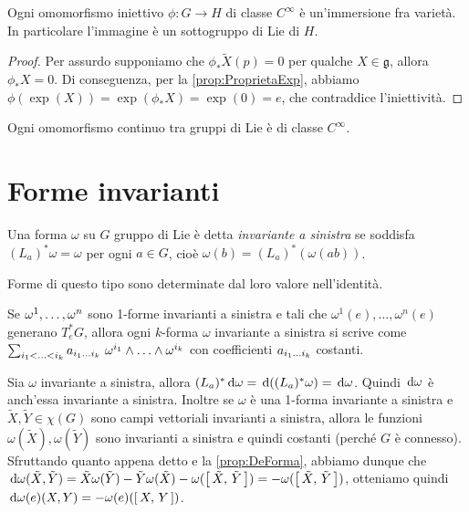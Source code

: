 \begin{corollary}
	Ogni omomorfismo iniettivo $\phi : G \to H$ di classe $C^\infty$ è un'immersione fra varietà. In particolare l'immagine è un sottogruppo di Lie di $H$.
\end{corollary}
\begin{proof}
	Per assurdo supponiamo che $\phi_*\tilde X(p) = 0$ per qualche $X \in \mathfrak g$, allora $\phi_*X = 0$. Di conseguenza, per la \cref{prop:ProprietaExp}, abbiamo $\phi(\exp(X)) = \exp(\phi_*X) = \exp(0) = e$, che contraddice l'iniettività.
\end{proof}


\begin{corollary}
	Ogni omomorfismo continuo tra gruppi di Lie è di classe $C^\infty$.
\end{corollary}



\section{Forme invarianti}

\begin{definition}
	Una forma $\omega$ su $G$ gruppo di Lie è detta \emph{invariante a sinistra} se soddisfa $(L_a)^*\omega = \omega$ per ogni $a \in G$, cioè $\omega(b) = (L_a)^*(\omega(ab))$.
\end{definition}

Forme di questo tipo sono determinate dal loro valore nell'identità.

Se $\seqa\omega n,$ sono 1-forme invarianti a sinistra e tali che $\omega^1(e),\ldots,\omega^n(e)$ generano $T_e^*G$, allora ogni $k$-forma $\omega$ invariante a sinistra si scrive come $\sum_{\seqb ik<} a_{\seqb ik{}}\ \omega^{i_1}\wedge \ldots \wedge\omega^{i_k}$ con coefficienti $a_{\seqb ik{}}$ costanti.

Sia $\omega$ invariante a sinistra, allora $(L_a)^*\de\omega = \de ((L_a)^*\omega) = \de \omega$. Quindi $\de\omega$ è anch'essa invariante a sinistra. 
Inoltre se $\omega$ è una 1-forma invariante a sinistra e $\tilde X,\tilde Y \in \chi(G)$ sono campi vettoriali invarianti a sinistra, allora le funzioni $\omega(\tilde X), \omega(\tilde Y)$ sono invarianti a sinistra e quindi costanti (perché $G$ è connesso).
Sfruttando quanto appena detto e la \cref{prop:DeForma}, abbiamo dunque che $\de \omega (\tilde X, \tilde Y) = \tilde X \omega (\tilde Y) - \tilde Y \omega(\tilde X) - \omega(\comm {\tilde X}{\tilde Y}) = - \omega (\comm{\tilde X}{\tilde Y})$, otteniamo quindi $\de \omega (e) (X,Y) = - \omega(e) (\comm XY)$.

